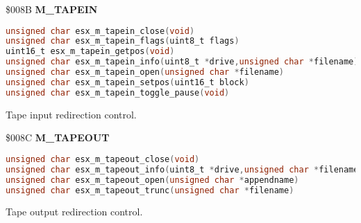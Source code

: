 \$008B \textbf{M\_TAPEIN}

\begin{lstlisting}[language=C]
unsigned char esx_m_tapein_close(void)
unsigned char esx_m_tapein_flags(uint8_t flags)
uint16_t esx_m_tapein_getpos(void)
unsigned char esx_m_tapein_info(uint8_t *drive,unsigned char *filename)
unsigned char esx_m_tapein_open(unsigned char *filename)
unsigned char esx_m_tapein_setpos(uint16_t block)
unsigned char esx_m_tapein_toggle_pause(void)
\end{lstlisting}

Tape input redirection control.


\$008C \textbf{M\_TAPEOUT}

\begin{lstlisting}[language=C]
unsigned char esx_m_tapeout_close(void)
unsigned char esx_m_tapeout_info(uint8_t *drive,unsigned char *filename)
unsigned char esx_m_tapeout_open(unsigned char *appendname)
unsigned char esx_m_tapeout_trunc(unsigned char *filename)
\end{lstlisting}

Tape output redirection control.


